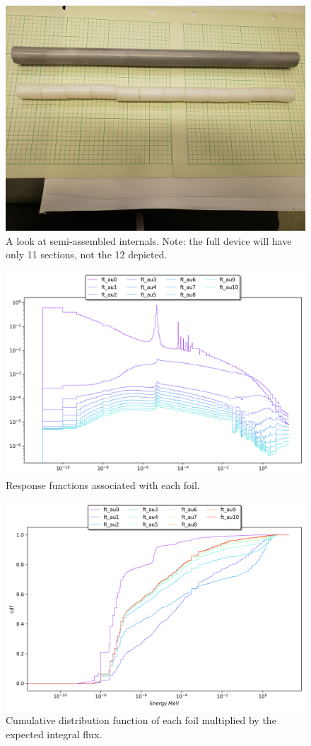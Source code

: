 \documentclass{amsart}
\theoremstyle{definition}
\begin{document}
\begin{figure}[!htb]
\includegraphics[width=0.6\linewidth]{img/assy0.jpg}
\caption{A look at semi-assembled internals. Note: the full device will have only 11 sections, not the 12 depicted.}
\end{figure}

\begin{figure}[!htb]
\includegraphics[width=0.8\linewidth]{../response/plot/ft_au.png}
\caption{Response functions associated with each foil.}
\end{figure}

\begin{figure}[!htb]
\includegraphics[width=0.8\linewidth]{../response/plot/ft_au_cdf.png}
\caption{Cumulative distribution function of each foil multiplied by the expected integral flux.}
\end{figure}
\end{document}
